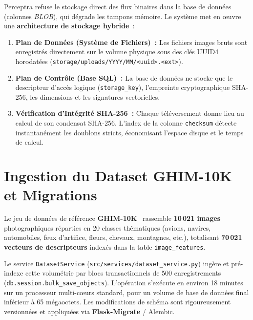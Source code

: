 Perceptra refuse le stockage direct des flux binaires dans la base de données (colonnes \textit{BLOB}), qui dégrade les tampons mémoire. Le système met en \oe{}uvre une \textbf{architecture de stockage hybride}~:
\begin{enumerate}
    \item \textbf{Plan de Données (Système de Fichiers)~:} Les fichiers images bruts sont enregistrés directement sur le volume physique sous des clés UUID4 horodatées (\texttt{storage/uploads/YYYY/MM/<uuid>.<ext>}).
    \item \textbf{Plan de Contrôle (Base SQL)~:} La base de données ne stocke que le descripteur d'accès logique (\texttt{storage\_key}), l'empreinte cryptographique SHA-256, les dimensions et les signatures vectorielles.
    \item \textbf{Vérification d'Intégrité SHA-256~:} Chaque téléversement donne lieu au calcul de son condensat SHA-256. L'index de la colonne \texttt{checksum} détecte instantanément les doublons stricts, économisant l'espace disque et le temps de calcul.
\end{enumerate}

\section{Ingestion du Dataset GHIM-10K et Migrations}

Le jeu de données de référence \textbf{GHIM-10K}~\cite{kaggle_ghim10k} rassemble \textbf{10\,021 images} photographiques réparties en 20 classes thématiques (avions, navires, automobiles, feux d'artifice, fleurs, chevaux, montagnes, etc.), totalisant \textbf{70\,021 vecteurs de descripteurs} indexés dans la table \texttt{image\_features}.

Le service \texttt{DatasetService} (\texttt{src/services/dataset\_service.py}) ingère et pré-indexe cette volumétrie par blocs transactionnels de 500 enregistrements (\texttt{db.session.bulk\_save\_objects}). L'opération s'exécute en environ 18 minutes sur un processeur multi-c\oe{}urs standard, pour un volume de base de données final inférieur à 65 mégaoctets. Les modifications de schéma sont rigoureusement versionnées et appliquées via \textbf{Flask-Migrate} / Alembic.
